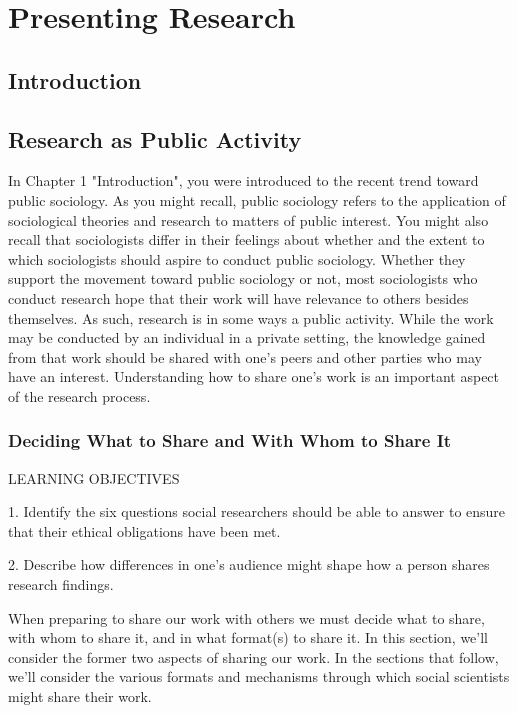 \chapter{Presenting Research}\label{ch15:writing_research}

\section{Introduction}

\section{Research as Public Activity}

In Chapter 1 "Introduction", you were introduced to the recent trend toward public sociology. As you might recall, public sociology refers to the application of sociological theories and research to matters of public interest. You might also recall that sociologists differ in their feelings about whether and the extent to which sociologists should aspire to conduct public sociology. Whether they support the movement toward public sociology or not, most sociologists who conduct research hope that their work will have relevance to others besides themselves. As such, research is in some ways a public activity. While the work may be conducted by an individual in a private setting, the knowledge gained from that work should be shared with one’s peers and other parties who may have an interest. Understanding how to share one’s work is an important aspect of the research process.

\subsection{Deciding What to Share and With Whom to Share It}

LEARNING OBJECTIVES

1. Identify the six questions social researchers should be able to answer to ensure that their ethical obligations have been met.

2. Describe how differences in one’s audience might shape how a person shares research findings.

When preparing to share our work with others we must decide what to share, with whom to share it, and in what format(s) to share it. In this section, we’ll consider the former two aspects of sharing our work. In the sections that follow, we’ll consider the various formats and mechanisms through which social scientists might share their work.

